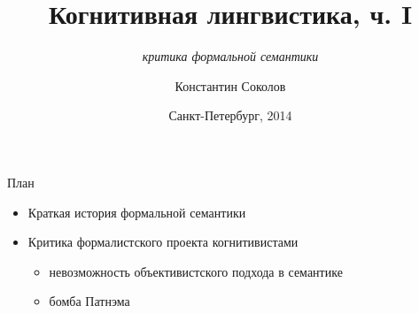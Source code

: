 \documentclass{beamer}
\begin{document}
\title{\Large{Когнитивная лингвистика, ч. I}}
\subtitle{\textit{критика формальной семантики}}
\author{Константин Соколов}
\date{Санкт-Петербург, 2014} 
\begin{frame}
    \thispagestyle{empty}
    \titlepage
\end{frame}

\begin{frame}{План}
\setcounter{framenumber}{1}
    \begin{itemize}
        \item Краткая история формальной семантики
        \medskip
        \item Критика формалистского проекта когнитивистами
        	\smallskip
        	\begin{itemize}
				\item невозможность объективистского подхода в семантике
				\smallskip
				\item бомба Патнэма
        	\end{itemize}
    \end{itemize}
\end{frame}

\end{document}

